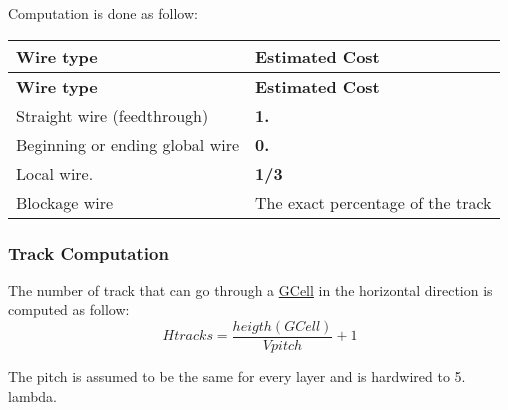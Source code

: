 Computation is done as follow\+: \tabulinesep=1mm
\begin{longtabu} spread 0pt [c]{*{2}{|X[-1]}|}
\hline
\rowcolor{\tableheadbgcolor}\textbf{ Wire type}&\textbf{ Estimated Cost }\\
\endfirsthead
\hline
\endfoot
\hline
\rowcolor{\tableheadbgcolor}\textbf{ Wire type}&\textbf{ Estimated Cost }\\
\endhead
Straight wire (feedthrough) &{\bfseries 1.} \\
Beginning or ending global wire &{\bfseries 0.} \\
Local wire. &{\bfseries 1/3} \\
Blockage wire &The exact percentage of the track \\
\end{longtabu}
\hypertarget{classKatabatic_1_1GCell_secGCellTrackComputation}{}\subsubsection{Track Computation}\label{classKatabatic_1_1GCell_secGCellTrackComputation}
The number of track that can go through a \mbox{\hyperlink{classKatabatic_1_1GCell}{G\+Cell}} in the horizontal direction is computed as follow\+: \[ Htracks = \frac{heigth(GCell)}{Vpitch} + 1 \]

The pitch is assumed to be the same for every layer and is hardwired to 5. lambda.

